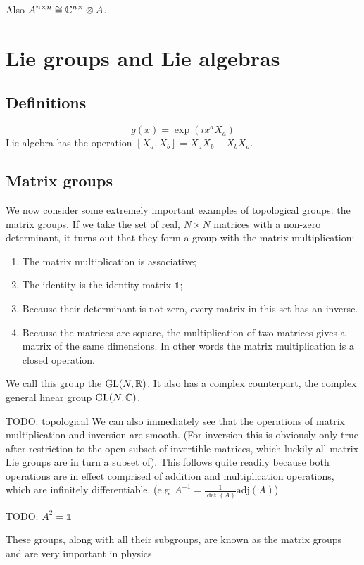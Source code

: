 Also $A^{n\times n} \cong \mathbb{C}^{n\times }\otimes A$.

\chapter{Lie groups and Lie algebras}
\section{Definitions}
\[ g(x) = \exp(ix^aX_a) \]
Lie algebra has the operation $[X_a,X_b]= X_aX_b - X_bX_a$. 
\section{Matrix groups}
We now consider some extremely important examples of topological groups: the matrix groups.
If we take the set of real, $N\times N$ matrices with a non-zero determinant, it turns out that they form a group with the matrix multiplication:
\begin{enumerate}
\item The matrix multiplication is associative;
\item The identity is the identity matrix $\mathbb{1}$;
\item Because their determinant is not zero, every matrix in this set has an inverse.
\item Because the matrices are square, the multiplication of two matrices gives a matrix of the same dimensions. In other words the matrix multiplication is a closed operation.
\end{enumerate}
We call this group the  $\operatorname{GL}(N, \mathbb{R})$. It also has a complex counterpart, the complex general linear group $\operatorname{GL}(N, \mathbb{C})$.

TODO: topological
We can also immediately see that the operations of matrix multiplication and inversion are smooth. (For inversion this is obviously only true after restriction to the open subset of invertible matrices, which luckily all matrix Lie groups are in turn a subset of). This follows quite readily because both operations are in effect comprised of addition and multiplication operations, which are infinitely differentiable. (e.g\ $A^{-1} = \frac{1}{\det(A)}\mathrm{adj}(A)$)

\begin{example}
TODO: $A^2 = \mathbb{1}$
\end{example}

These groups, along with all their subgroups, are known as the matrix groups and are very important in physics.

